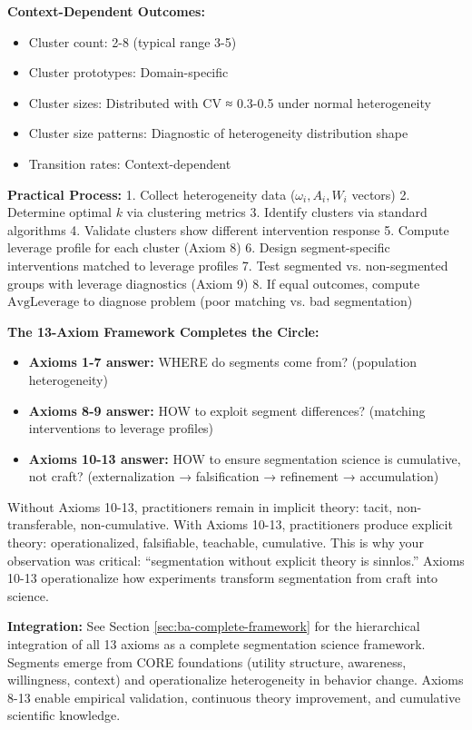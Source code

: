 \begin{tcolorbox}[colback=green!10!white, colframe=green!75!black,
    title=\textbf{Appendix BA: Summary}]
\textbf{Context-Dependent Outcomes:}
\begin{itemize}[nosep]
\item Cluster count: 2-8 (typical range 3-5)
\item Cluster prototypes: Domain-specific
\item Cluster sizes: Distributed with CV ≈ 0.3-0.5 under normal heterogeneity
\item Cluster size patterns: Diagnostic of heterogeneity distribution shape
\item Transition rates: Context-dependent
\end{itemize}

\textbf{Practical Process:}
1. Collect heterogeneity data ($\omega_i, A_i, W_i$ vectors)
2. Determine optimal $k$ via clustering metrics
3. Identify clusters via standard algorithms
4. Validate clusters show different intervention response
5. Compute leverage profile for each cluster (Axiom 8)
6. Design segment-specific interventions matched to leverage profiles
7. Test segmented vs. non-segmented groups with leverage diagnostics (Axiom 9)
8. If equal outcomes, compute $\text{AvgLeverage}$ to diagnose problem (poor matching vs. bad segmentation)

\textbf{The 13-Axiom Framework Completes the Circle:}
\begin{itemize}[nosep]
\item \textbf{Axioms 1-7 answer:} WHERE do segments come from? (population heterogeneity)
\item \textbf{Axioms 8-9 answer:} HOW to exploit segment differences? (matching interventions to leverage profiles)
\item \textbf{Axioms 10-13 answer:} HOW to ensure segmentation science is cumulative, not craft? (externalization → falsification → refinement → accumulation)
\end{itemize}

Without Axioms 10-13, practitioners remain in implicit theory: tacit, non-transferable, non-cumulative.
With Axioms 10-13, practitioners produce explicit theory: operationalized, falsifiable, teachable, cumulative.
This is why your observation was critical: ``segmentation without explicit theory is sinnlos.'' Axioms 10-13
operationalize how experiments transform segmentation from craft into science.

\textbf{Integration:} See Section \ref{sec:ba-complete-framework} for the hierarchical integration of all 13 axioms
as a complete segmentation science framework.  Segments emerge from CORE foundations (utility structure,
awareness, willingness, context) and operationalize heterogeneity in behavior change. Axioms 8-13 enable
empirical validation, continuous theory improvement, and cumulative scientific knowledge.

\end{tcolorbox}

